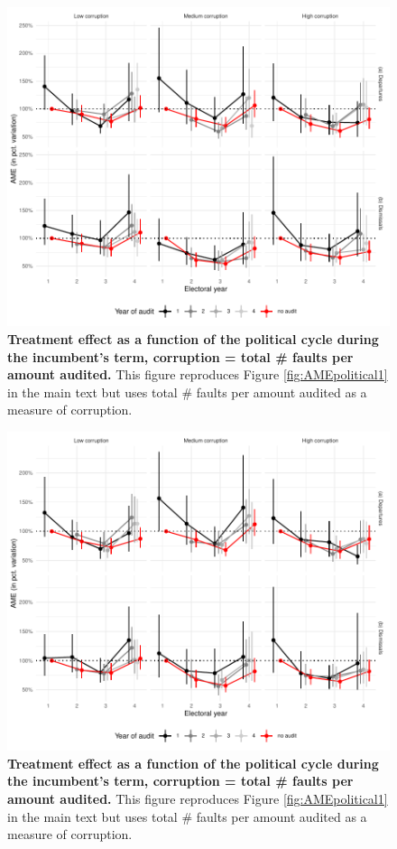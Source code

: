 \documentclass[12pt,a4paper]{article}
\theoremstyle{definition}
\begin{document}
{ \begin{figure}[H]
    \centering
    \includegraphics{figures/AMEpoliticalAllPerAMount_term1Client.pdf}
    \caption{{\bf Treatment effect as a function of the political cycle during the incumbent's term, corruption = total \# faults per amount audited.} This figure reproduces Figure \ref{fig:AMEpolitical1} in the main text but uses total \# faults per amount audited as a measure of corruption.}
    \label{fig:AMEpolitical1_allPerAmount}
\end{figure}

\begin{figure}[H]
    \centering
    \includegraphics{figures/AMEpoliticalSeriousPerAmount_term1Client.pdf}
    \caption{{\bf Treatment effect as a function of the political cycle during the incumbent's term, corruption = total \# faults per amount audited.} This figure reproduces Figure \ref{fig:AMEpolitical1} in the main text but uses total \# faults per amount audited as a measure of corruption.}
    \label{fig:AMEpolitical1_seriousPerAmount}
\end{figure}

}
\end{document}
